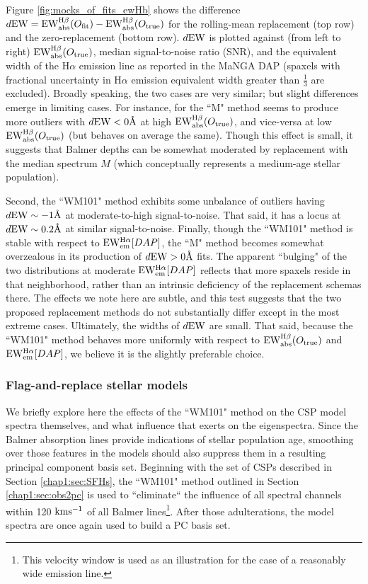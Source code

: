 Figure \ref{fig:mocks_of_fits_ewHb} shows the difference $d{\rm EW} = {\rm EW_{abs}^{H\beta}}(O_{\rm fit}) - {\rm EW_{abs}^{H\beta}}(O_{\rm true})$ for the rolling-mean replacement (top row) and the zero-replacement (bottom row). $d{\rm EW}$ is plotted against (from left to right) ${\rm EW_{abs}^{H\beta}}(O_{\rm true})$, median signal-to-noise ratio (SNR), and the equivalent width of the H$\alpha$ emission line as reported in the MaNGA DAP (spaxels with fractional uncertainty in H$\alpha$ emission equivalent width greater than $\frac{1}{3}$ are excluded). Broadly speaking, the two cases are very similar; but slight differences emerge in limiting cases. For instance, for the ``M" method seems to produce more outliers with $d{\rm EW} < 0 \mbox{\AA}$ at high ${\rm EW_{abs}^{H\beta}}(O_{\rm true})$, and vice-versa at low ${\rm EW_{abs}^{H\beta}}(O_{\rm true})$ (but behaves on average the same). Though this effect is small, it suggests that Balmer depths can be somewhat moderated by replacement with the median spectrum $M$ (which conceptually represents a medium-age stellar population).

Second, the ``WM101" method exhibits some unbalance of outliers having $d{\rm EW} \sim -1 \mbox{\AA}$ at moderate-to-high signal-to-noise. That said, it has a locus at $d{\rm EW} \sim 0.2 \mbox{\AA}$ at similar signal-to-noise. Finally, though the ``WM101" method is stable with respect to ${\rm EW^{H\alpha}_{em}} [DAP]$, the ``M" method becomes somewhat overzealous in its production of $d{\rm EW} > 0 \mbox{\AA}$ fits. The apparent ``bulging" of the two distributions at moderate ${\rm EW^{H\alpha}_{em}} [DAP]$ reflects that more spaxels reside in that neighborhood, rather than an intrinsic deficiency of the replacement schemas there. The effects we note here are subtle, and this test suggests that the two proposed replacement methods do not substantially differ except in the most extreme cases. Ultimately, the widths of $d{\rm EW}$ are small. That said, because the ``WM101" method behaves more uniformly with respect to ${\rm EW_{abs}^{H\beta}}(O_{\rm true})$ and ${\rm EW^{H\alpha}_{em}} [DAP]$, we believe it is the slightly preferable choice.

\subsubsection{Flag-and-replace stellar models}

We briefly explore here the effects of the ``WM101" method on the CSP model spectra themselves, and what influence that exerts on the eigenspectra. Since the Balmer absorption lines provide indications of stellar population age, smoothing over those features in the models should also suppress them in a resulting principal component basis set. Beginning with the set of CSPs described in Section \ref{chap1:sec:SFHs}, the ``WM101" method outlined in Section \ref{chap1:sec:obs2pc} is used to ``eliminate`` the influence of all spectral channels within 120 ${\rm km s^{-1}}$ of all Balmer lines\footnote{This velocity window is used as an illustration for the case of a reasonably wide emission line.}. After those adulterations, the model spectra are once again used to build a PC basis set.

